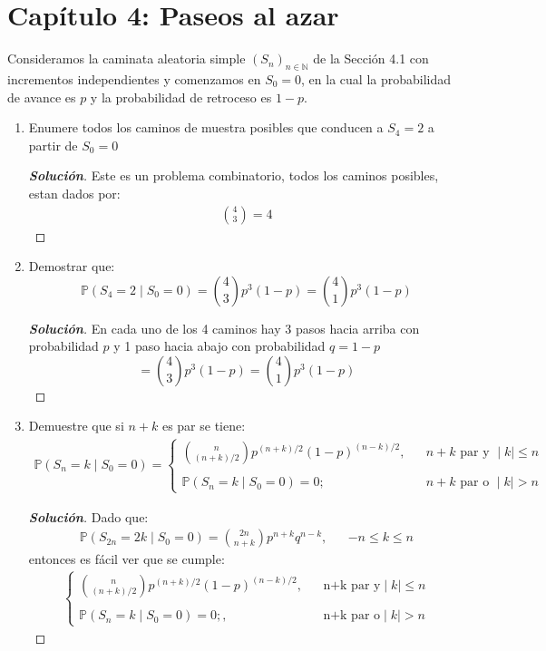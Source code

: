 \documentclass[12pt, letterpaper]{article}
\newcommand{\p}{\mathbb{P}}
\newenvironment{manualtheorem}[1]{%
  \renewcommand\themanualtheoreminner{#1}%
  \manualtheoreminner
}{\endmanualtheoreminner}
\newenvironment{solucion}
  {\renewcommand\qedsymbol{$\square$}\begin{proof}[\textbf{Solución}]}
  {\end{proof}}
\begin{document}
    
    \newpage
    \section*{Capítulo 4: Paseos al azar}
    \begin{manualtheorem}{4.1}
    Consideramos la caminata aleatoria simple $(S_n)_{n\in \mathbb{N}}$ de la Sección 4.1 con incrementos independientes y comenzamos en $S_0 = 0$, en la cual la probabilidad de avance es $p$ y la probabilidad de retroceso es $1-p$.
    \renewcommand{\labelenumi}{(\alph{enumi})}
    \begin{enumerate}
        \item Enumere todos los caminos de muestra posibles que conducen a $S_4 = 2$ a partir de $S_0 = 0$
        \begin{solucion}
            Este es un problema combinatorio, todos los caminos posibles, estan dados por:
            \begin{align*}
                \binom{4}{3}=4
            \end{align*}
        \end{solucion}
        \item Demostrar que: 
            $$\p(S_4=2\mid S_0=0)= \binom{4}{3} p^3(1-p)=\binom{4}{1}p^3(1-p)$$
            \begin{solucion}
                En cada uno de los 4 caminos hay 3 pasos hacia arriba con probabilidad $p$ y 1 paso hacia abajo con probabilidad $q=1-p$
                $$= \binom{4}{3} p^3(1-p)=\binom{4}{1}p^3(1-p)$$
            \end{solucion}
        \item Demuestre que si $n + k$ es par se tiene:
        \begin{align*}
            \p(S_n=k \mid S_0=0)= \left\{\begin{matrix}
            \binom{n}{(n+k)/2}p^{(n+k)/2}(1-p)^{(n-k)/2},& &  n+k \textrm{ par y } \mid k \mid \leq n\\ \\
            \p(S_n=k \mid S_0=0)=0;& & n+k \textrm{ par o } \mid k \mid >n
            \end{matrix}\right.
        \end{align*}
        \begin{solucion}
            Dado que:
            \begin{align*}
                \p(S_{2n}=2k \mid S_0=0) = \binom{2n}{n+k} p^{n+k}q^{n-k},& & -n\leq k\leq n
            \end{align*}
            entonces es fácil ver que se cumple:
            \begin{align*}
                \left\{\begin{matrix}
                \binom{n}{(n+k)/2}p^{(n+k)/2}(1-p)^{(n-k)/2},& & \textrm{n+k par y}  \mid k \mid \leq n\\ \\
                \p(S_n=k \mid S_0=0)=0;,& & \textrm{n+k par o}  \mid k \mid >n
                \end{matrix} \right. 
            \end{align*}
            

\end{solucion}
\end{enumerate}
\end{manualtheorem}
\end{document}
